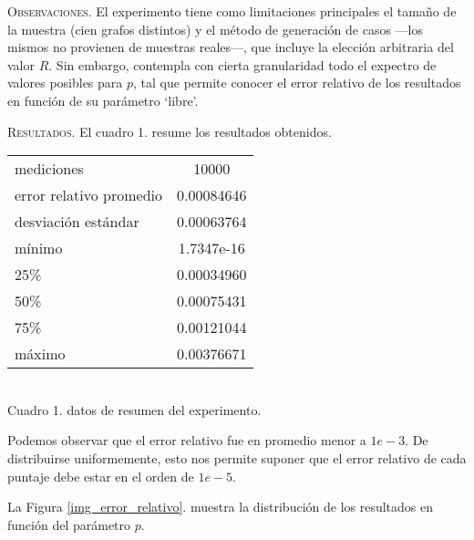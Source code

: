 \noindent \textsc{Observaciones}. El experimento tiene como limitaciones principales el tamaño de la muestra (cien grafos distintos) y el método de generación de casos ---los mismos no provienen de muestras reales---, que incluye la elección arbitraria del valor $R$. Sin embargo, contempla con cierta granularidad todo el expectro de valores posibles para $p$, tal que permite conocer el error relativo de los resultados en función de su parámetro `libre'.
\vspace{1em}


\noindent \textsc{Resultados}. El cuadro 1. resume los resultados obtenidos. 
\vspace{1.5em}

\begin{center}
    \begin{tabular}{ |l|c| } 
     \hline
    mediciones              & 10000         \\
    error relativo promedio & 0.00084646    \\
    desviación estándar     & 0.00063764    \\
    mínimo                  & 1.7347e-16    \\
    25\%                    & 0.00034960    \\
    50\%                    & 0.00075431    \\
    75\%                    & 0.00121044    \\
    máximo                  & 0.00376671    \\
    \hline
    \end{tabular} \\
    \bigskip
    Cuadro 1. datos de resumen del experimento. 
\end{center}
\vspace{1em}

Podemos observar que el error relativo fue en promedio menor a $1e-3$. De distribuirse uniformemente, esto nos permite suponer que el error relativo de cada puntaje debe estar en el orden de $1e-5$.
\vspace{1em}

La Figura \ref{img_error_relativo}. muestra la distribución de los resultados en función del parámetro $p$.

\vspace{1em}

